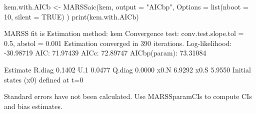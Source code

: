 \begin{Schunk}
\begin{Sinput}
 kem.with.AICb <- MARSSaic(kem,
   output = "AICbp",
   Options = list(nboot = 10, silent = TRUE)
 )
 print(kem.with.AICb)
\end{Sinput}
\begin{Soutput}
MARSS fit is
Estimation method: kem 
Convergence test: conv.test.slope.tol = 0.5, abstol = 0.001
Estimation converged in 390 iterations. 
Log-likelihood: -30.98719 
AIC: 71.97439   AICc: 72.89747   AICbp(param): 73.31084   
 
       Estimate
R.diag   0.1402
U.1      0.0477
Q.diag   0.0000
x0.N     6.9292
x0.S     5.9550
Initial states (x0) defined at t=0

Standard errors have not been calculated. 
Use MARSSparamCIs to compute CIs and bias estimates.
\end{Soutput}
\end{Schunk}
